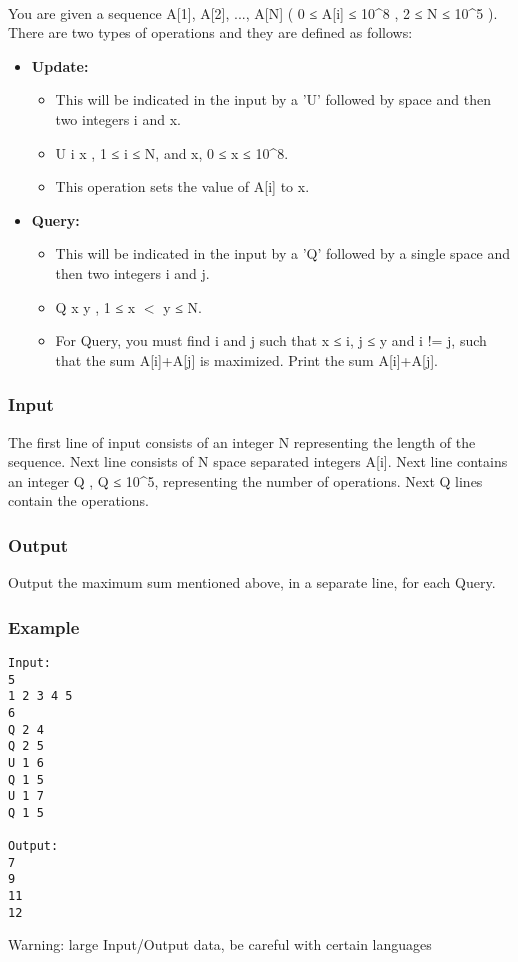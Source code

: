 

 

You are given a sequence A[1], A[2], ..., A[N] ( 0 ≤ A[i] ≤ 10^8 , 2 ≤ N ≤ 10^5 ). There are two types of operations and they are defined as follows:
\begin{itemize}
	\item \textbf{Update: }
\begin{itemize}
	\item \textbf{​}This will be indicated in the input by a 'U' followed by space and then two integers i and x.
	\item U i x , 1 ≤ i ≤ N, and x, 0 ≤ x ≤ 10^8.
	\item This operation sets the value of A[i] to x.
\end{itemize}
	\item \textbf{Query:}
\begin{itemize}
	\item This will be indicated in the input by a 'Q' followed by a single space and then two integers i and j.
	\item Q x y , 1 ≤ x $<$ y ≤ N.
	\item For Query, you must find i and j such that x ≤ i, j ≤ y and i != j, such that the sum A[i]+A[j] is maximized. Print the sum A[i]+A[j].
\end{itemize}
\end{itemize}

\subsubsection{Input}

The first line of input consists of an integer N representing the length of the sequence. Next line consists of N space separated integers A[i]. Next line contains an integer Q , Q ≤ 10^5, representing the number of operations. Next Q lines contain the operations.

\subsubsection{Output}

Output the maximum sum mentioned above, in a separate line, for each Query.

\subsubsection{Example}
\begin{verbatim}
Input:
5
1 2 3 4 5
6
Q 2 4
Q 2 5
U 1 6
Q 1 5
U 1 7
Q 1 5

Output:
7
9
11
12

\end{verbatim}

Warning: large Input/Output data, be careful with certain languages
